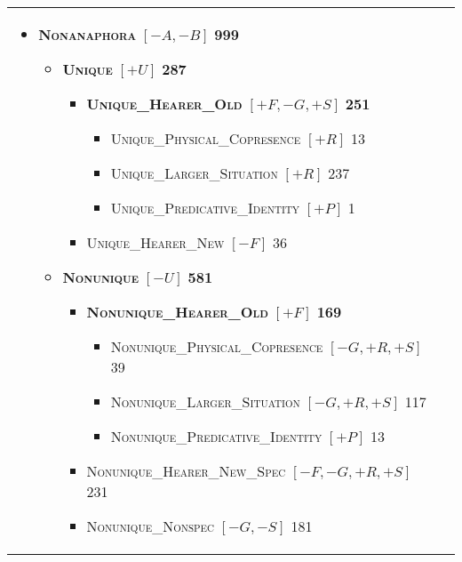 \documentclass[11pt,letterpaper]{article}
\newcommand{\ilbl}[1]{\mbox{\textbf{\textsc{#1}}}} %
\newcommand{\llbl}[1]{\mbox{\textsc{#1}}} %
\begin{document}
\begin{figure*}[t]\small\centering
\begin{tabular}{@{}p{}p{}@{}}
\begin{itemize}
\item    \ilbl{Nonanaphora} {\bf\scriptsize $[-A,-B]$} \hfill {\bf\tiny 999}
  \begin{itemize}
  \item      \ilbl{Unique} {\bf\scriptsize $[+U]$} \hfill {\bf\tiny 287}
    \begin{itemize}
    \item        \ilbl{Unique\_Hearer\_Old} {\bf\scriptsize $[+F,-G,+S]$} \hfill {\bf\tiny 251}
      \begin{itemize}
      \item          \llbl{Unique\_Physical\_Copresence} {\bf\scriptsize $[+R]$} \hfill {\tiny 13}
      \item          \llbl{Unique\_Larger\_Situation} {\bf\scriptsize $[+R]$} \hfill {\tiny 237}
      \item          \llbl{Unique\_Predicative\_Identity} {\bf\scriptsize $[+P]$} \hfill {\tiny 1}
      \end{itemize}
    \item        \llbl{Unique\_Hearer\_New} {\bf\scriptsize $[-F]$} \hfill {\tiny 36}
    \end{itemize}
   \item     \ilbl{Nonunique} {\bf\scriptsize $[-U]$} \hfill {\bf\tiny 581}
     \begin{itemize}
     \item       \ilbl{Nonunique\_Hearer\_Old} {\bf\scriptsize $[+F]$} \hfill {\bf\tiny 169}
       \begin{itemize}
       \item         \llbl{Nonunique\_Physical\_Copresence} {\bf\scriptsize $[-G,+R,+S]$} \hfill {\tiny 39}
       \item         \llbl{Nonunique\_Larger\_Situation} {\bf\scriptsize $[-G,+R,+S]$} \hfill {\tiny 117}
       \item         \llbl{Nonunique\_Predicative\_Identity} {\bf\scriptsize $[+P]$} \hfill {\tiny 13}
       \end{itemize}
     \item       \llbl{Nonunique\_Hearer\_New\_Spec} {\bf\scriptsize $[-F,-G,+R,+S]$} \hfill {\tiny 231}
     \item       \llbl{Nonunique\_Nonspec} {\bf\scriptsize $[-G,-S]$} \hfill {\tiny 181}
     \end{itemize}

\end{itemize}
\end{itemize}
\end{tabular}
\end{figure*}
\end{document}
